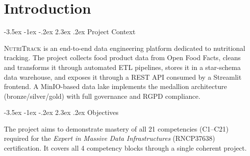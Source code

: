 \documentclass[a4paper,11pt,oneside,openany]{report}
\makeatletter
\renewcommand\section{\@startsection{section}{1}{\z@}%
  {-3.5ex \@plus -1ex \@minus -.2ex}%
  {2.3ex \@plus.2ex}%
  {\normalfont\Large\bfseries\color{ntgreen}}}
\newcommand{\nutritrack}{\textsc{NutriTrack}}
\newcommand{\off}{Open Food Facts}
\newcommand{\rgpd}{RGPD}
\makeatother
\begin{document}
\tableofcontents

\clearpage

\chapter{Introduction}
\label{ch:intro}

\section{Project Context}

\nutritrack{} is an end-to-end data engineering platform dedicated to
nutritional tracking. The project collects food product data from \off{},
cleans and transforms it through automated ETL pipelines, stores it in a
star-schema data warehouse, and exposes it through a REST API consumed by
a Streamlit frontend. A MinIO-based data lake implements the medallion
architecture (bronze/silver/gold) with full governance and \rgpd{}
compliance.

\begin{center}
\end{center}

\section{Objectives}

The project aims to demonstrate mastery of all 21 competencies (C1--C21)
required for the \textit{Expert in Massive Data Infrastructures}
(RNCP37638) certification. It covers all 4 competency blocks through a
single coherent project.
\end{document}
